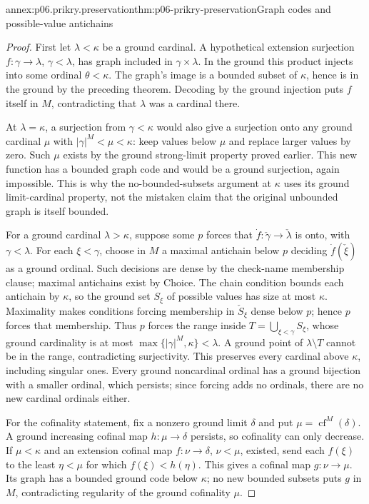 \begin{annexitem}{annex:p06.prikry.preservation}{thm:p06-prikry-preservation}{Graph codes and possible-value antichains}
\begin{proof}
First let \(\lambda<\kappa\) be a ground cardinal. A hypothetical
extension surjection \(f:\gamma\to\lambda\), \(\gamma<\lambda\),
has graph included in \(\gamma\times\lambda\). In the ground this
product injects into some ordinal \(\theta<\kappa\). The graph's
image is a bounded subset of \(\kappa\), hence is in the ground by
the preceding theorem. Decoding by the ground injection puts \(f\)
itself in \(M\), contradicting that \(\lambda\) was a cardinal there.

At \(\lambda=\kappa\), a surjection from \(\gamma<\kappa\) would
also give a surjection onto any ground cardinal
\(\mu\) with \(|\gamma|^M<\mu<\kappa\): keep values below \(\mu\)
and replace larger values by zero. Such \(\mu\) exists by the ground
strong-limit property proved earlier. This new function has a bounded
graph code and would be a ground surjection, again impossible. This is
why the no-bounded-subsets argument at \(\kappa\) uses its ground
limit-cardinal property, not the mistaken claim that the original
unbounded graph is itself bounded.

For a ground cardinal \(\lambda>\kappa\), suppose some \(p\) forces
that \(\dot f:\check\gamma\to\check\lambda\) is onto, with
\(\gamma<\lambda\). For each \(\xi<\gamma\), choose in \(M\) a
maximal antichain below \(p\) deciding \(\dot f(\check\xi)\) as a
ground ordinal. Such decisions are dense by the check-name membership
clause; maximal antichains exist by Choice. The chain condition bounds
each antichain by \(\kappa\), so the ground set \(S_\xi\) of possible
values has size at most \(\kappa\). Maximality makes conditions forcing
membership in \(\check S_\xi\) dense below \(p\); hence \(p\) forces
that membership. Thus \(p\) forces the range inside
\(T=\bigcup_{\xi<\gamma}S_\xi\), whose ground cardinality is at most
\(\max\{|\gamma|^M,\kappa\}<\lambda\). A ground point of
\(\lambda\setminus T\) cannot be in the range, contradicting surjectivity.
This preserves every cardinal above \(\kappa\), including singular ones.
Every ground noncardinal ordinal has a ground bijection with a smaller
ordinal, which persists; since forcing adds no ordinals, there are no
new cardinal ordinals either.

For the cofinality statement, fix a nonzero ground limit \(\delta\)
and put \(\mu=\operatorname{cf}^M(\delta)\). A ground increasing
cofinal map \(h:\mu\to\delta\) persists, so cofinality can only
decrease. If \(\mu<\kappa\) and an extension cofinal map
\(f:\nu\to\delta\), \(\nu<\mu\), existed, send each \(f(\xi)\)
to the least \(\eta<\mu\) for which \(f(\xi)<h(\eta)\).
This gives a cofinal map \(g:\nu\to\mu\). Its graph has a bounded
ground code below \(\kappa\); no new bounded subsets puts \(g\) in
\(M\), contradicting regularity of the ground cofinality \(\mu\).


\end{proof}
\end{annexitem}
